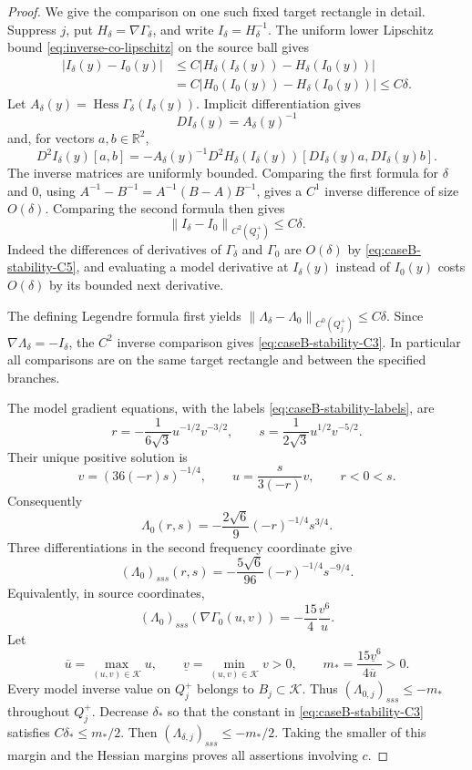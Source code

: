 \documentclass[11pt,a4paper]{article}
\numberwithin{equation}{section}
\theoremstyle{remark}
\newcommand{\R}{\mathbb R}
\newcommand{\norm}[1]{\left\lVert #1\right\rVert}
\DeclareMathOperator{\Hess}{Hess}
\begin{document}
\begin{proof}
We give the comparison on one such fixed target rectangle in detail.
Suppress $j$, put $H_\delta=\nabla\Gamma_\delta$, and write
$I_\delta=H_\delta^{-1}$. The uniform lower Lipschitz bound
\eqref{eq:inverse-co-lipschitz} on the source ball gives
\begin{align*}
 |I_\delta(y)-I_0(y)|
 &\le C|H_\delta(I_\delta(y))-H_\delta(I_0(y))|\\
 &=C|H_0(I_0(y))-H_\delta(I_0(y))|\le C\delta.
\end{align*}
Let $A_\delta(y)=\Hess\Gamma_\delta(I_\delta(y))$. Implicit
differentiation gives
\[
 DI_\delta(y)=A_\delta(y)^{-1}
\]
and, for vectors $a,b\in\R^2$,
\[
 D^2I_\delta(y)[a,b]
 =-A_\delta(y)^{-1}D^2H_\delta(I_\delta(y))
                     [DI_\delta(y)a,DI_\delta(y)b].
\]
The inverse matrices are uniformly bounded. Comparing the first formula
for $\delta$ and $0$, using
$A^{-1}-B^{-1}=A^{-1}(B-A)B^{-1}$, gives a $C^1$ inverse difference
of size $O(\delta)$. Comparing the second formula then gives
\[
 \norm{I_\delta-I_0}_{C^2(Q_j^+)}\le C\delta.
\]
Indeed the differences of derivatives of $\Gamma_\delta$ and
$\Gamma_0$ are $O(\delta)$ by \eqref{eq:caseB-stability-C5}, and
evaluating a model derivative at $I_\delta(y)$ instead of $I_0(y)$
costs $O(\delta)$ by its bounded next derivative.

The defining Legendre formula first yields
$\norm{\Lambda_\delta-\Lambda_0}_{C^0(Q_j^+)}\le C\delta$.
Since $\nabla\Lambda_\delta=-I_\delta$, the $C^2$ inverse comparison
gives \eqref{eq:caseB-stability-C3}. In particular all comparisons
are on the same target rectangle and between the specified branches.

The model gradient equations, with the labels
\eqref{eq:caseB-stability-labels}, are
\[
 r=-\frac1{6\sqrt3}u^{-1/2}v^{-3/2},\qquad
 s=\frac1{2\sqrt3}u^{1/2}v^{-5/2}.
\]
Their unique positive solution is
\[
 v=(36(-r)s)^{-1/4},\qquad u=\frac{s}{3(-r)}v,
 \qquad r<0<s.
\]
Consequently
\begin{equation}\label{eq:caseB-stability-model-Legendre}
 \Lambda_0(r,s)=-\frac{2\sqrt6}{9}(-r)^{-1/4}s^{3/4}.
\end{equation}
Three differentiations in the second frequency coordinate give
\begin{equation}\label{eq:caseB-stability-model-third}
 (\Lambda_0)_{sss}(r,s)
 =-\frac{5\sqrt6}{96}(-r)^{-1/4}s^{-9/4}.
\end{equation}
Equivalently, in source coordinates,
\begin{equation}\label{eq:caseB-stability-third-pullback}
 (\Lambda_0)_{sss}(\nabla\Gamma_0(u,v))
 =-\frac{15}{4}\frac{v^6}{u}.
\end{equation}
Let
\[
 \overline u=\max_{(u,v)\in\mathcal K}u,
 \qquad \underline v=\min_{(u,v)\in\mathcal K}v>0,
 \qquad m_* =\frac{15\underline v^6}{4\overline u}>0.
\]
Every model inverse value on $Q_j^+$ belongs to $B_j\subset\mathcal K$.
Thus $(\Lambda_{0,j})_{sss}\le-m_*$ throughout $Q_j^+$.
Decrease $\delta_*$ so that the constant in
\eqref{eq:caseB-stability-C3} satisfies $C\delta_*\le m_*/2$.
Then $(\Lambda_{\delta,j})_{sss}\le-m_*/2$. Taking the smaller of
this margin and the Hessian margins proves all assertions involving $c$.


\end{proof}
\end{document}

